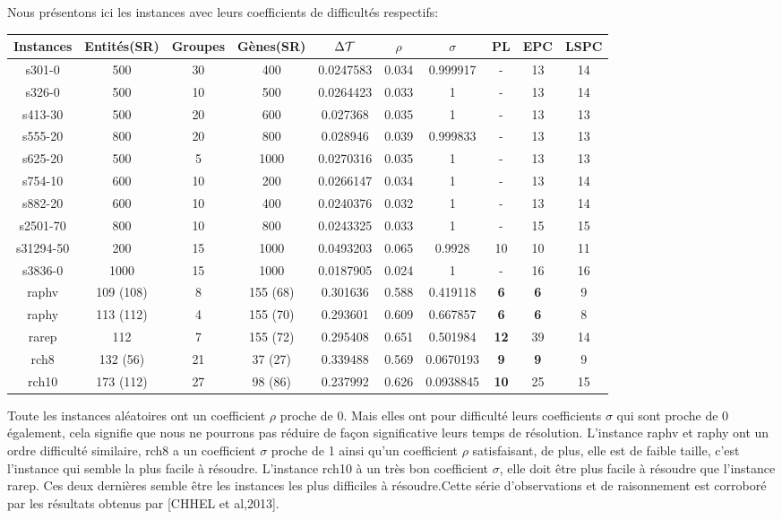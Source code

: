 Nous présentons ici les instances avec leurs coefficients de difficultés respectifs:
\begin{center}
\begin{tabular}{|c|c|c|c|c|c|c|c|c|c|}
\hline 
Instances & Entités(SR) & Groupes & Gènes(SR)& $\Delta\cal{T}$ & $\rho$ & $\sigma$ & PL & EPC & LSPC \\ 
\hline 
s301-0 & 500 & 30 & 400 & 0.0247583 & 0.034 & 0.999917 & - & 13 & 14 \\ 
\hline 
s326-0 & 500 & 10 & 500 & 0.0264423 & 0.033 & 1 & - & 13 & 14 \\ 
\hline 
s413-30 & 500 & 20 & 600 & 0.027368 & 0.035 & 1 & - & 13 & 13 \\ 
\hline 
s555-20 & 800 & 20 & 800 & 0.028946 & 0.039 & 0.999833 & - & 13 & 13 \\ 
\hline 
s625-20 & 500 & 5 & 1000 & 0.0270316 & 0.035 & 1 & - & 13 & 13 \\ 
\hline 
s754-10 & 600 & 10 & 200 & 0.0266147 & 0.034 & 1 & - & 13 & 14 \\ 
\hline 
s882-20 & 600 & 10 & 400 & 0.0240376 & 0.032 & 1 & - & 13 & 14 \\ 
\hline 
s2501-70 & 800 & 10 & 800 & 0.0243325 & 0.033 & 1 & - & 15 & 15 \\ 
\hline 
s31294-50 & 200 & 15 & 1000 & 0.0493203 & 0.065 & 0.9928 & 10 & 10 & 11 \\ 
\hline 
s3836-0 & 1000 & 15 & 1000 & 0.0187905 & 0.024 & 1 & - & 16 & 16 \\ 
\hline 
raphv & 109 (108) & 8 & 155 (68) & 0.301636 & 0.588 & 0.419118 & \textbf{6} & \textbf{6} & 9 \\ 
\hline 
raphy & 113 (112) & 4 & 155 (70) & 0.293601 & 0.609 & 0.667857 & \textbf{6} & \textbf{6} & 8 \\ 
\hline 
rarep & 112 & 7 & 155 (72) & 0.295408 & 0.651 & 0.501984 & \textbf{12} & 39 & 14 \\ 
\hline 
rch8 & 132 (56) & 21 & 37 (27) & 0.339488 & 0.569 & 0.0670193 & \textbf{9} & \textbf{9} & 9 \\ 
\hline 
rch10 & 173 (112) & 27 & 98 (86) & 0.237992 & 0.626 & 0.0938845 & \textbf{10} & 25 & 15 \\ 
\hline 
\end{tabular} 
\end{center}

Toute les instances aléatoires ont un coefficient $\rho$ proche de 0. Mais elles ont pour difficulté leurs coefficients $\sigma$ qui sont proche de 0 également, cela signifie que nous ne pourrons pas réduire de façon significative leurs temps de résolution. L'instance raphv et raphy ont un ordre difficulté similaire, rch8 a un coefficient $\sigma$ proche de 1 ainsi qu'un coefficient $\rho$ satisfaisant, de plus, elle est de faible taille, c'est l'instance qui semble la plus facile à résoudre. L'instance rch10 à un très bon coefficient $\sigma$, elle doit être plus facile à résoudre que l'instance rarep. Ces deux dernières semble être les instances les plus difficiles à résoudre.Cette série d'observations et de raisonnement est corroboré par les résultats obtenus par [CHHEL et al,2013].

